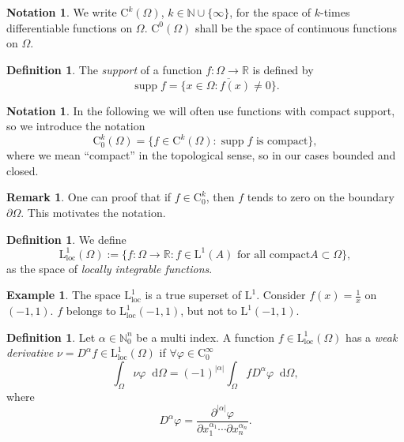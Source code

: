 \documentclass[12pt,a4paper,twoside, open=right]{scrreprt}
\theoremstyle{definition}
\newtheorem{rem}[auf]{Remark}
\newtheorem{defn}[auf]{Definition}
\newtheorem{bsp}[auf]{Example}
\newtheorem{notation}[auf]{Notation}
\theoremstyle{plain}
\DeclareMathOperator{\supp}{supp} %
\newcommand{\abs}[1]{\left\vert #1\right\vert}
\newcommand{\rr}{\mathbb{R}}
\newcommand{\nn}{\mathbb{N}}
\newcommand{\D}{\mathop{}\!\mathrm{d}}
\begin{document}
\begin{notation}
    We write $\mathrm{C}^k(\Omega)$, $k\in\nn\cup\{\infty\}$, for the space of $k$-times differentiable functions on $\Omega$. $\mathrm{C}^0(\Omega)$ shall be the space of continuous functions on $\Omega$.
\end{notation}
\begin{defn}
    The \emph{support} of a function $f\colon \Omega\to\rr$ is defined by 
    \begin{equation}
        \supp f = \overline{\{x\in\Omega\colon f(x)\neq 0\}}.
    \end{equation}
\end{defn}
\begin{notation}
    In the following we will often use functions with compact support, so we introduce the notation
    \begin{equation}
        \mathrm{C}^k_0(\Omega)=\{f\in \mathrm{C}^k(\Omega)\colon \supp f \text{ is compact} \},
    \end{equation}
    where we mean \enquote{compact} in the topological sense, so in our cases bounded and closed.
\end{notation}
\begin{rem}
    \label{rem:testfzero}
    One can proof that if $f\in \mathrm{C}^k_0$, then $f$ tends to zero on the boundary $\partial\Omega$. This motivates the notation.
\end{rem}
\begin{defn}
    We define 
    \begin{equation}
        \mathrm{L}^1_{\mathrm{loc}}(\Omega):=\{f\colon\Omega\to\rr\colon f\in \mathrm{L}^1(A) \text{ for all compact} A\subset\Omega \},
    \end{equation}
    as the space of \emph{locally integrable functions}.
\end{defn}
\begin{bsp}
    The space $\mathrm{L}^1_\mathrm{loc}$ is a true superset of $\mathrm{L}^1$. Consider $f(x)=\frac{1}{x}$ on $(-1,1)$. $f$ belongs to $\mathrm{L}^1_\mathrm{loc}(-1,1)$, but not to $\mathrm{L}^1(-1,1)$. 
\end{bsp}
\begin{defn}
    \label{defn:weakderivative}
    Let $\alpha\in\nn^n_0$ be a multi index. A function $f\in \mathrm{L}^1_{\mathrm{loc}}(\Omega)$ has a \emph{weak derivative} $\nu=D^\alpha f\in \mathrm{L}^1_\mathrm{loc}(\Omega)$ if $\forall \varphi\in \mathrm{C}_0^\infty$
    \begin{equation}
        \int_\Omega\nu\varphi\D\Omega = (-1)^{\abs{\alpha}}\int_\Omega fD^\alpha\varphi \D\Omega,
    \end{equation}
    where 
    \begin{equation}
        D^\alpha\varphi=\frac{\partial^{\abs{\alpha}}\varphi}{\partial x_1^{\alpha_1}\dotsb\partial x_n^{\alpha_n}}.
    \end{equation}
\end{defn}
\end{document}
